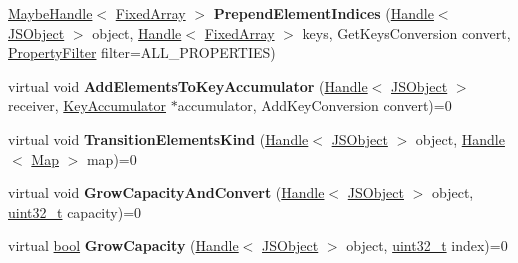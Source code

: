 \begin{DoxyCompactItemize}
\mbox{\hyperlink{classv8_1_1internal_1_1MaybeHandle}{Maybe\+Handle}}$<$ \mbox{\hyperlink{classv8_1_1internal_1_1FixedArray}{Fixed\+Array}} $>$ {\bfseries Prepend\+Element\+Indices} (\mbox{\hyperlink{classv8_1_1internal_1_1Handle}{Handle}}$<$ \mbox{\hyperlink{classv8_1_1internal_1_1JSObject}{J\+S\+Object}} $>$ object, \mbox{\hyperlink{classv8_1_1internal_1_1Handle}{Handle}}$<$ \mbox{\hyperlink{classv8_1_1internal_1_1FixedArray}{Fixed\+Array}} $>$ keys, Get\+Keys\+Conversion convert, \mbox{\hyperlink{namespacev8_afbf02b6b1152a3e25d7bde90798209ac}{Property\+Filter}} filter=A\+L\+L\+\_\+\+P\+R\+O\+P\+E\+R\+T\+I\+ES)
\item 
\mbox{\label{classv8_1_1internal_1_1ElementsAccessor_ac195aeda41125e5d870ae9e6dfa2ee2b}} 
virtual void {\bfseries Add\+Elements\+To\+Key\+Accumulator} (\mbox{\hyperlink{classv8_1_1internal_1_1Handle}{Handle}}$<$ \mbox{\hyperlink{classv8_1_1internal_1_1JSObject}{J\+S\+Object}} $>$ receiver, \mbox{\hyperlink{classv8_1_1internal_1_1KeyAccumulator}{Key\+Accumulator}} $\ast$accumulator, Add\+Key\+Conversion convert)=0
\item 
\mbox{\label{classv8_1_1internal_1_1ElementsAccessor_a73ab9ac41747a86c6c890a03ae85bf92}} 
virtual void {\bfseries Transition\+Elements\+Kind} (\mbox{\hyperlink{classv8_1_1internal_1_1Handle}{Handle}}$<$ \mbox{\hyperlink{classv8_1_1internal_1_1JSObject}{J\+S\+Object}} $>$ object, \mbox{\hyperlink{classv8_1_1internal_1_1Handle}{Handle}}$<$ \mbox{\hyperlink{classv8_1_1internal_1_1Map}{Map}} $>$ map)=0
\item 
\mbox{\label{classv8_1_1internal_1_1ElementsAccessor_ac09aad01025323a4348186c0e99f2e90}} 
virtual void {\bfseries Grow\+Capacity\+And\+Convert} (\mbox{\hyperlink{classv8_1_1internal_1_1Handle}{Handle}}$<$ \mbox{\hyperlink{classv8_1_1internal_1_1JSObject}{J\+S\+Object}} $>$ object, \mbox{\hyperlink{classuint32__t}{uint32\+\_\+t}} capacity)=0
\item 
\mbox{\label{classv8_1_1internal_1_1ElementsAccessor_a01c188f87d58cc9f417d7c8d35009c76}} 
virtual \mbox{\hyperlink{classbool}{bool}} {\bfseries Grow\+Capacity} (\mbox{\hyperlink{classv8_1_1internal_1_1Handle}{Handle}}$<$ \mbox{\hyperlink{classv8_1_1internal_1_1JSObject}{J\+S\+Object}} $>$ object, \mbox{\hyperlink{classuint32__t}{uint32\+\_\+t}} index)=0

\end{DoxyCompactItemize}
